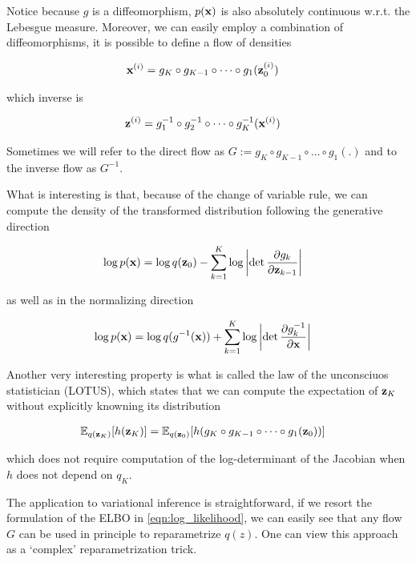 \documentclass[12pt]{article}
\begin{document}
Notice because $g$ is a diffeomorphism, $p(\textbf{x})$ is also absolutely continuous w.r.t. the Lebesgue measure. Moreover, we can easily employ a combination of diffeomorphisms, it is possible to define a flow of densities

\begin{align}
    \textbf{x}^{(i)} &= g_K \circ g_{K-1} \circ \dots \circ g_1(\textbf{z}_0^{(i)}) 
\end{align}

which inverse is 

\begin{align}
    \textbf{z}^{(i)} &= g^{-1}_1 \circ g^{-1}_{2} \circ \dots \circ g^{-1}_K(\textbf{x}^{(i)})
\end{align}

Sometimes we will refer to the direct flow as $G := g_K \circ g_{K-1} \circ \dots \circ g_1(.)$ and to the inverse flow as $G^{-1}$. 

What is interesting is that, because of the change of variable rule, we can compute the density of the transformed distribution following the generative direction 

\begin{align}
    \log p(\textbf{x}) &= \log q(\textbf{z}_0) - \sum_{k=1}^K \log \left| \det \frac{\partial g_k}{\partial \textbf{z}_{k-1}} \right|
\end{align}

as well as in the normalizing direction

\begin{align}
    \log p(\textbf{x}) &= \log q(g^{-1}(\textbf{x})) + \sum_{k=1}^K \log \left| \det \frac{\partial g_k^{-1}}{\partial \textbf{x}} \right|
\end{align}


Another very interesting property is what is called the law of the unconsciuos statistician (LOTUS), which states that we can compute the expectation of $\textbf{z}_K$ without explicitly knowning its distribution

\begin{align}
    \mathbb{E}_{q(\textbf{z}_K)}[h(\textbf{z}_K)] &= \mathbb{E}_{q(\textbf{z}_0)}[h(g_K \circ g_{K-1} \circ \dots \circ g_1(\textbf{z}_0))]
\end{align}

which does not require computation of the log-determinant of the Jacobian when $h$ does not depend on $q_K$.


The application to variational inference is straightforward, if we resort the formulation of the ELBO in \eqref{eqn:log_likelihood}, we can easily see that any flow $G$ can be used in principle to reparametrize $q(z)$. One can view this approach as a `complex' reparametrization trick. 
\end{document}
